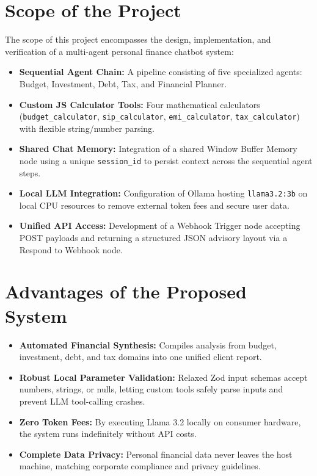 \documentclass[12pt,a4paper]{report}
\begin{document}
\section{Scope of the Project}
The scope of this project encompasses the design, implementation, and verification of a multi-agent personal finance chatbot system:
\begin{itemize}
    \item \textbf{Sequential Agent Chain:} A pipeline consisting of five specialized agents: Budget, Investment, Debt, Tax, and Financial Planner.
    \item \textbf{Custom JS Calculator Tools:} Four mathematical calculators (\texttt{budget\_calculator}, \texttt{sip\_calculator}, \texttt{emi\_calculator}, \texttt{tax\_calculator}) with flexible string/number parsing.
    \item \textbf{Shared Chat Memory:} Integration of a shared Window Buffer Memory node using a unique \texttt{session\_id} to persist context across the sequential agent steps.
    \item \textbf{Local LLM Integration:} Configuration of Ollama hosting \texttt{llama3.2:3b} on local CPU resources to remove external token fees and secure user data.
    \item \textbf{Unified API Access:} Development of a Webhook Trigger node accepting POST payloads and returning a structured JSON advisory layout via a Respond to Webhook node.
\end{itemize}

\section{Advantages of the Proposed System}
\begin{itemize}
    \item \textbf{Automated Financial Synthesis:} Compiles analysis from budget, investment, debt, and tax domains into one unified client report.
    \item \textbf{Robust Local Parameter Validation:} Relaxed Zod input schemas accept numbers, strings, or nulls, letting custom tools safely parse inputs and prevent LLM tool-calling crashes.
    \item \textbf{Zero Token Fees:} By executing Llama 3.2 locally on consumer hardware, the system runs indefinitely without API costs.
    \item \textbf{Complete Data Privacy:} Personal financial data never leaves the host machine, matching corporate compliance and privacy guidelines.
\end{itemize}
\end{document}
